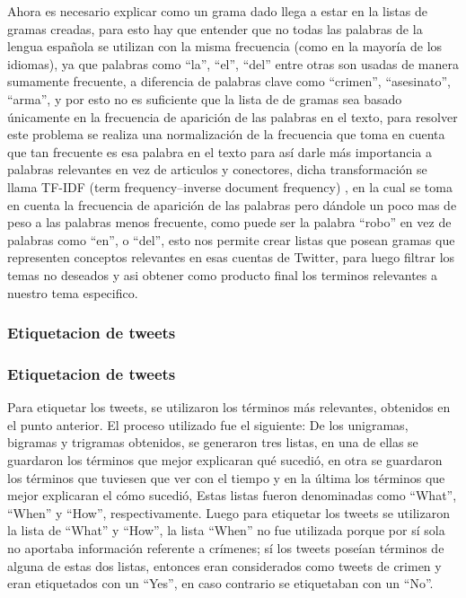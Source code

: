 \documentclass{beamer}
\begin{document}
\begin{frame}
Ahora es necesario explicar como un grama dado llega a estar en la listas de gramas creadas, para esto hay que entender que no todas las palabras de la lengua española se utilizan con la misma frecuencia (como en la mayoría de los idiomas), ya que palabras como “la”, “el”, “del” entre otras son usadas de manera sumamente frecuente, a diferencia de palabras clave como “crimen”, “asesinato”, “arma”, y por esto no es suficiente que la lista de de gramas sea basado únicamente en la frecuencia de aparición de las palabras en el texto, para resolver este problema se realiza una normalización de la frecuencia que toma en cuenta que tan frecuente es esa palabra en el texto para así darle más importancia a palabras relevantes en vez de articulos y conectores, dicha transformación se llama TF-IDF (term frequency–inverse document frequency) , en la cual se toma en cuenta la frecuencia de aparición de las palabras pero dándole un poco mas de peso a las palabras menos frecuente, como puede ser la palabra “robo” en vez de palabras como “en”, o “del”, esto nos permite crear listas que posean gramas que representen conceptos relevantes en esas cuentas de Twitter, para luego filtrar los temas no deseados y asi obtener como producto final los terminos relevantes a nuestro tema especifico.
\end{frame}


\subsubsection{Etiquetacion de tweets}
\begin{frame}
\frametitle{Etiquetacion de tweets}
Para etiquetar los tweets, se utilizaron los términos más relevantes, obtenidos en el punto anterior. El proceso utilizado fue el siguiente: De los unigramas, bigramas y trigramas obtenidos, se generaron tres listas, en una de ellas se guardaron los términos que mejor explicaran qué sucedió, en otra se guardaron los términos que tuviesen que ver con el tiempo y en la última los términos que mejor explicaran el cómo sucedió, Estas listas fueron denominadas como “What”, “When” y “How”, respectivamente. Luego para etiquetar los tweets se utilizaron la lista de “What” y “How”, la lista “When” no fue utilizada porque por sí sola no aportaba información referente a crímenes; sí los tweets poseían términos de alguna de estas dos listas, entonces eran considerados como tweets de crimen y eran etiquetados con un “Yes”, en caso contrario se etiquetaban con un “No”. 

\end{frame}
\end{document}
